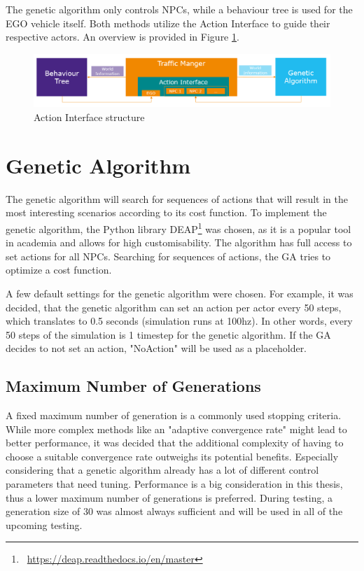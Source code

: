The genetic algorithm only controls NPCs, while a behaviour tree is used for the EGO vehicle itself. Both methods utilize the Action Interface to guide their respective actors. An overview is provided in Figure \ref{fig:implementation:traffic_manager_structure}.

\begin{figure}[ht] 
	\includegraphics[width=1\linewidth]{figures/tm_structure}
	\caption{Action Interface structure}
	\label{fig:implementation:traffic_manager_structure}
\end{figure}

\section{Genetic Algorithm}
The genetic algorithm will search for sequences of actions that will result in the most interesting scenarios according to its cost function. To implement the genetic algorithm, the Python library DEAP\footnote{~\url{https://deap.readthedocs.io/en/master}} was chosen, as it is a popular tool in academia and allows for high customisability. The algorithm has full access to set actions for all NPCs. Searching for sequences of actions, the GA tries to optimize a cost function.

A few default settings for the genetic algorithm were chosen. For example, it was decided, that the genetic algorithm can set an action per actor every 50 steps, which translates to 0.5 seconds (simulation runs at 100hz). In other words, every 50 steps of the simulation is 1 timestep for the genetic algorithm. If the GA decides to not set an action, "NoAction" will be used as a placeholder.

\subsection{Maximum Number of Generations}
A fixed maximum number of generation is a commonly used stopping criteria. While more complex methods like an "adaptive convergence rate" might lead to better performance, it was decided that the additional complexity of having to choose a suitable convergence rate outweighs its potential benefits. Especially considering that a genetic algorithm already has a lot of different control parameters that need tuning. Performance is a big consideration in this thesis, thus a lower maximum number of generations is preferred. During testing, a generation size of 30 was almost always sufficient and will be used in all of the upcoming testing.

